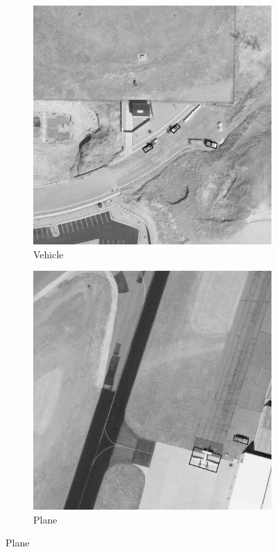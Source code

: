 \begin{figure}[h!]
    \begin{subfigure}[t]{0.38\textwidth}
        \centering
        \includegraphics[width=\linewidth]{images/015Results/03ablation/comp_images/ground_truth/427.png}
        \caption{Vehicle}
    \end{subfigure}
    \begin{subfigure}[t]{0.38\textwidth}
        \centering
        \includegraphics[width=\linewidth]{images/015Results/03ablation/comp_images/ground_truth/487.png}
        \caption{Plane}
    \end{subfigure}
    

\end{figure}
